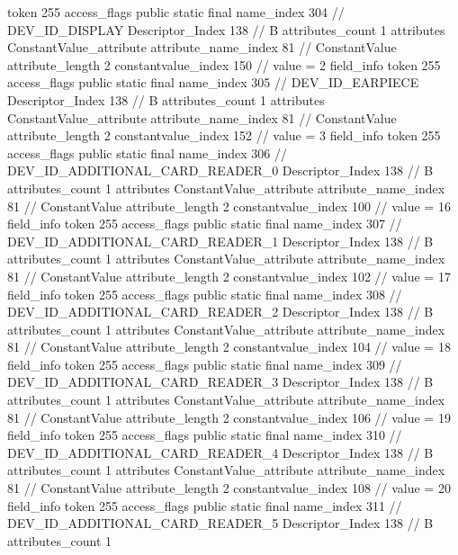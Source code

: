 {{{{{				token	255
				access_flags	public static final
				name_index	304		// DEV_ID_DISPLAY
				Descriptor_Index	138		// B
				attributes_count	1
				attributes {
				ConstantValue_attribute {
					attribute_name_index	81		// ConstantValue
					attribute_length	2
					constantvalue_index	150		// value = 2
				}
				}
			}
			field_info {
				token	255
				access_flags	public static final
				name_index	305		// DEV_ID_EARPIECE
				Descriptor_Index	138		// B
				attributes_count	1
				attributes {
				ConstantValue_attribute {
					attribute_name_index	81		// ConstantValue
					attribute_length	2
					constantvalue_index	152		// value = 3
				}
				}
			}
			field_info {
				token	255
				access_flags	public static final
				name_index	306		// DEV_ID_ADDITIONAL_CARD_READER_0
				Descriptor_Index	138		// B
				attributes_count	1
				attributes {
				ConstantValue_attribute {
					attribute_name_index	81		// ConstantValue
					attribute_length	2
					constantvalue_index	100		// value = 16
				}
				}
			}
			field_info {
				token	255
				access_flags	public static final
				name_index	307		// DEV_ID_ADDITIONAL_CARD_READER_1
				Descriptor_Index	138		// B
				attributes_count	1
				attributes {
				ConstantValue_attribute {
					attribute_name_index	81		// ConstantValue
					attribute_length	2
					constantvalue_index	102		// value = 17
				}
				}
			}
			field_info {
				token	255
				access_flags	public static final
				name_index	308		// DEV_ID_ADDITIONAL_CARD_READER_2
				Descriptor_Index	138		// B
				attributes_count	1
				attributes {
				ConstantValue_attribute {
					attribute_name_index	81		// ConstantValue
					attribute_length	2
					constantvalue_index	104		// value = 18
				}
				}
			}
			field_info {
				token	255
				access_flags	public static final
				name_index	309		// DEV_ID_ADDITIONAL_CARD_READER_3
				Descriptor_Index	138		// B
				attributes_count	1
				attributes {
				ConstantValue_attribute {
					attribute_name_index	81		// ConstantValue
					attribute_length	2
					constantvalue_index	106		// value = 19
				}
				}
			}
			field_info {
				token	255
				access_flags	public static final
				name_index	310		// DEV_ID_ADDITIONAL_CARD_READER_4
				Descriptor_Index	138		// B
				attributes_count	1
				attributes {
				ConstantValue_attribute {
					attribute_name_index	81		// ConstantValue
					attribute_length	2
					constantvalue_index	108		// value = 20
				}
				}
			}
			field_info {
				token	255
				access_flags	public static final
				name_index	311		// DEV_ID_ADDITIONAL_CARD_READER_5
				Descriptor_Index	138		// B
				attributes_count	1
}}}}}
